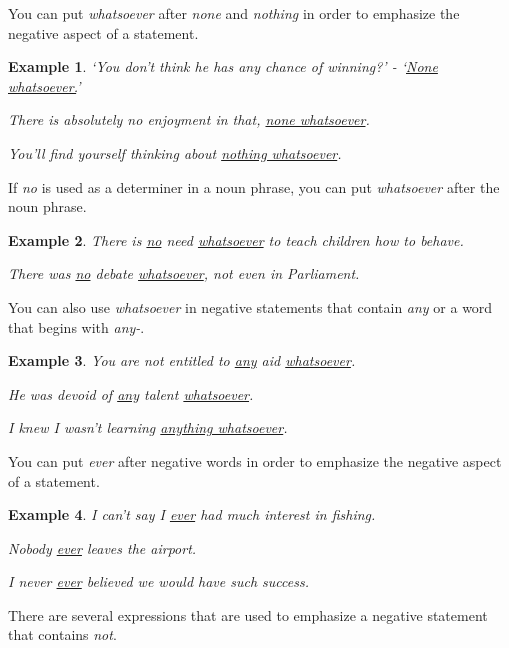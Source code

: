 \documentclass[oneside]{book}
\numberwithin{equation}{section}
\newtheorem{example}{Example}[section]
\begin{document}
%
\noindent{} You can put \textit{whatsoever} after \textit{none} and \textit{nothing} in order to emphasize the negative aspect of a statement.
\begin{example}
    `You don't think he has any chance of winning?' - `\underline{None whatsoever.}'
    
    There is absolutely no enjoyment in that, \underline{none whatsoever}.
    
    You'll find yourself thinking about \underline{nothing whatsoever}.
\end{example}
If \textit{no} is used as a determiner in a noun phrase, you can put \textit{whatsoever} after the noun phrase.
\begin{example}
    There is \underline{no} need \underline{whatsoever} to teach children how to behave.
    
    There was \underline{no} debate \underline{whatsoever}, not even in Parliament.
\end{example}
You can also use \textit{whatsoever} in negative statements that contain \textit{any} or a word that begins with \textit{any-}.
\begin{example}
    You are not entitled to \underline{any} aid \underline{whatsoever}.
    
    He was devoid of \underline{any} talent \underline{whatsoever}.
    
    I knew I wasn't learning \underline{anything whatsoever}.
\end{example}
%
\noindent{} You can put \textit{ever} after negative words in order to emphasize the negative aspect of a statement.
\begin{example}
    I can't say I \underline{ever} had much interest in fishing.
    
    Nobody \underline{ever} leaves the airport.
    
    I never \underline{ever} believed we would have such success.
\end{example}
%
\noindent{} There are several expressions that are used to emphasize a negative statement that contains \textit{not}.
\end{document}
